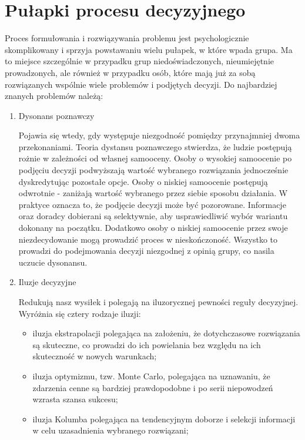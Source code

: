 \section{Pułapki procesu decyzyjnego}
Proces formułowania i rozwiązywania problemu jest psychologicznie skomplikowany
i sprzyja powstawaniu wielu pułapek, w które wpada grupa. Ma to miejsce
szczególnie w przypadku grup niedoświadczonych, nieumiejętnie prowadzonych, ale 
również w przypadku osób, które mają już za sobą rozwiązanych wspólnie wiele 
problemów i podjętych decyzji.
Do najbardziej znanych problemów należą:
\begin{enumerate}
  \item Dysonans poznawczy
  
  Pojawia się wtedy, gdy występuje niezgodność pomiędzy przynajmniej dwoma
  przekonaniami. Teoria dystansu poznawczego stwierdza, że ludzie postępują
  rożnie w zależności od własnej samooceny. Osoby o wysokiej samoocenie po
  podjęciu decyzji podwyższają wartość wybranego rozwiązania jednocześnie
  dyskredytując pozostałe opcje. Osoby o niskiej samoocenie postępują odwrotnie
  - zaniżają wartość wybranego przez siebie sposobu działania. W praktyce
  oznacza to, że podjęcie decyzji może być pozorowane. Informacje oraz doradcy
  dobierani są selektywnie, aby usprawiedliwić wybór wariantu dokonany na
  początku. Dodatkowo osoby o niskiej samoocenie przez swoje niezdecydowanie
  mogą prowadzić proces w nieskończoność. Wszystko to prowadzi do podejmowania
  decyzji niezgodnej z opinią grupy, co nasila uczucie dysonansu.

  \item Iluzje decyzyjne
  
  Redukują nasz wysiłek i polegają na iluzorycznej pewności reguły decyzyjnej.
  Wyróżnia się cztery rodzaje iluzji:
  \begin{itemize}
    \item iluzja ekstrapolacji polegająca na założeniu, że dotychczasowe
    rozwiązania są skuteczne, co prowadzi do ich powielania bez względu na ich
    skuteczność w nowych warunkach;
    
    \item iluzja optymizmu, tzw. Monte Carlo, polegająca na uznawaniu, że
    zdarzenia cenne są bardziej prawdopodobne i po serii niepowodzeń wzrasta
    szansa sukcesu;
    
    \item iluzja Kolumba polegająca na tendencyjnym doborze i selekcji
    informacji w celu uzasadnienia wybranego rozwiązani;
    

\end{itemize}
\end{enumerate}
